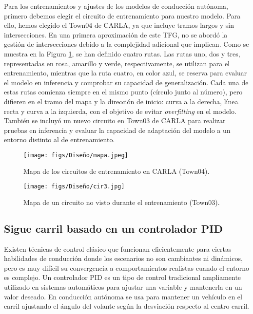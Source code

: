 Para los entrenamientos y ajustes de los modelos de conducción autónoma, primero debemos elegir el circuito de entrenamiento para nuestro modelo. Para ello, hemos elegido el Town04 de CARLA, ya que incluye tramos largos y sin intersecciones. En una primera aproximación de este \ac{TFG}, no se abordó la gestión de intersecciones debido a la complejidad adicional que implican. Como se muestra en la Figura \ref{fig:mapa}, se han definido cuatro rutas. Las rutas uno, dos y tres, representadas en rosa, amarillo y verde, respectivamente, se utilizan para el entrenamiento, mientras que la ruta cuatro, en color azul, se reserva para evaluar el modelo en inferencia y comprobar su capacidad de generalización. Cada una de estas rutas comienza siempre en el mismo punto (círculo junto al número), pero difieren en el tramo del mapa y la dirección de inicio: curva a la derecha, línea recta y curva a la izquierda, con el objetivo de evitar \textit{overfitting} en el modelo. También se incluyó un nuevo circuito en Town03 de CARLA para realizar pruebas en inferencia y evaluar la capacidad de adaptación del modelo a un entorno distinto al de entrenamiento.

\begin{figure}[ht]
  \centering
  \texttt{[image: figs/Diseño/mapa.jpeg]}
  \caption{Mapa de los circuitos de entrenamiento en CARLA (Town04).}
  \label{fig:mapa}
\end{figure}

\begin{figure}[ht]
\centering
\texttt{[image: figs/Diseño/cir3.jpg]}
\caption{Mapa de un circuito no visto durante el entrenamiento (Town03).}
\label{fig:cir3}
\end{figure}

\subsection{Sigue carril basado en un controlador PID}

Existen técnicas de control clásico que funcionan eficientemente para ciertas habilidades de conducción donde los escenarios no son cambiantes ni dinámicos, pero es muy difícil su convergencia a comportamientos realistas cuando el entorno es complejo. Un controlador \ac{PID} es un tipo de control tradicional ampliamente utilizado en sistemas automáticos para ajustar una variable y mantenerla en un valor deseado. En conducción autónoma se usa para mantener un vehículo en el carril ajustando el ángulo del volante según la desviación respecto al centro carril.

